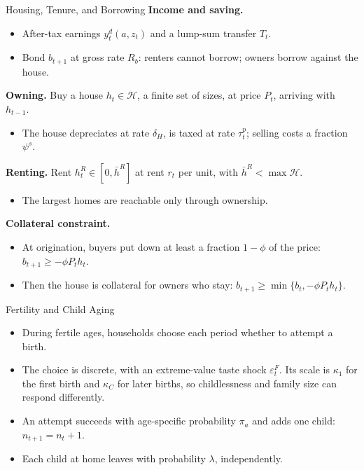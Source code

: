 \begin{frame}[label=housing-constraints]{Housing, Tenure, and Borrowing}
\small
\setlength{\abovedisplayskip}{2pt}\setlength{\belowdisplayskip}{2pt}
\textbf{Income and saving.}
\begin{itemize}\setlength\itemsep{2pt}
  \item After-tax earnings $y_t^d(a,z_t)$ and a lump-sum transfer $T_t$.
  \item Bond $b_{t+1}$ at gross rate $R_b$: renters cannot borrow; owners borrow against the house.
\end{itemize}

\medskip
\textbf{Owning.} Buy a house $h_t\in\mathcal H$, a finite set of sizes, at price $P_t$, arriving with $h_{t-1}$.
\begin{itemize}\setlength\itemsep{2pt}
  \item The house depreciates at rate $\delta_H$, is taxed at rate $\tau_t^p$; selling costs a fraction $\psi^s$.
\end{itemize}

\medskip
\textbf{Renting.} Rent $h_t^R\in[0,\bar h^R]$ at rent $r_t$ per unit, with $\bar h^R<\max\mathcal H$.
\begin{itemize}\setlength\itemsep{2pt}
  \item The largest homes are reachable only through ownership.
\end{itemize}

\medskip
\textbf{Collateral constraint.}
\begin{itemize}\setlength\itemsep{2pt}
  \item At origination, buyers put down at least a fraction $1-\phi$ of the price: $b_{t+1}\geq-\phi P_t h_t$.
  \item Then the house is collateral for owners who stay: $b_{t+1}\geq\min\{b_t,-\phi P_t h_t\}$.
\end{itemize}

\end{frame}

\begin{frame}{Fertility and Child Aging}
\small
\begin{itemize}\setlength\itemsep{0.6em}
  \item During fertile ages, households choose each period whether to attempt a birth.
  \item The choice is discrete, with an extreme-value taste shock $\varepsilon_t^F$. Its scale is $\kappa_1$ for the first birth and $\kappa_C$ for later births, so childlessness and family size can respond differently.
  \item An attempt succeeds with age-specific probability $\pi_a$ and adds one child: $n_{t+1}=n_t+1$.
  \item Each child at home leaves with probability $\lambda$, independently.
\end{itemize}
\end{frame}

